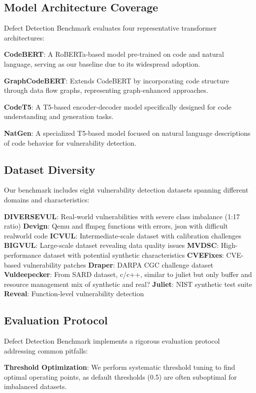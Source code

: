 \documentclass[letterpaper]{article}
\begin{document}
\subsection{Model Architecture Coverage}
Defect Detection Benchmark evaluates four representative transformer architectures:

\textbf{CodeBERT}: A RoBERTa-based model pre-trained on code and natural language, serving as our baseline due to its widespread adoption.

\textbf{GraphCodeBERT}: Extends CodeBERT by incorporating code structure through data flow graphs, representing graph-enhanced approaches.

\textbf{CodeT5}: A T5-based encoder-decoder model specifically designed for code understanding and generation tasks.

\textbf{NatGen}: A specialized T5-based model focused on natural language descriptions of code behavior for vulnerability detection.

\subsection{Dataset Diversity}
Our benchmark includes eight vulnerability detection datasets spanning different domains and characteristics:

\textbf{DIVERSEVUL}: Real-world vulnerabilities with severe class imbalance (1:17 ratio)
\textbf{Devign}: Qemu and ffmpeg functions with errors, json with difficult realworld code
\textbf{ICVUL}: Intermediate-scale dataset with calibration challenges
\textbf{BIGVUL}: Large-scale dataset revealing data quality issues
\textbf{MVDSC}: High-performance dataset with potential synthetic characteristics
\textbf{CVEFixes}: CVE-based vulnerability patches
\textbf{Draper}: DARPA CGC challenge dataset
\textbf{Vuldeepecker}: From SARD dataset, c/c++, similar to juliet but only buffer and resource management mix of synthetic and real?
\textbf{Juliet}: NIST synthetic test suite
\textbf{Reveal}: Function-level vulnerability detection

\subsection{Evaluation Protocol}
Defect Detection Benchmark implements a rigorous evaluation protocol addressing common pitfalls:

\textbf{Threshold Optimization}: We perform systematic threshold tuning to find optimal operating points, as default thresholds (0.5) are often suboptimal for imbalanced datasets.
\end{document}
